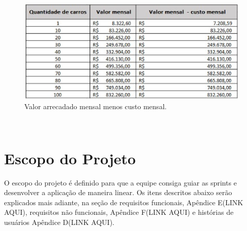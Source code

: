 \newpage
\begin{figure}
    \centering
    \includegraphics{exemplos/diagramas/Valor arrecadado mensal menos custo mensal.jpeg}
    \caption{Valor arrecadado mensal menos custo mensal.}
    \label{fig:Valor arrecadado mensal menos custo mensal.}
\end{figure}\\

\section{Escopo do Projeto}
O escopo do projeto é definido para que a equipe consiga guiar as sprints e desenvolver a aplicação de maneira linear. Os itens descritos abaixo serão explicados mais adiante, na seção de requisitos funcionais, Apêndice E(LINK AQUI), requisitos não funcionais, Apêndice F(LINK AQUI) e histórias de usuários Apêndice D(LINK AQUI).

